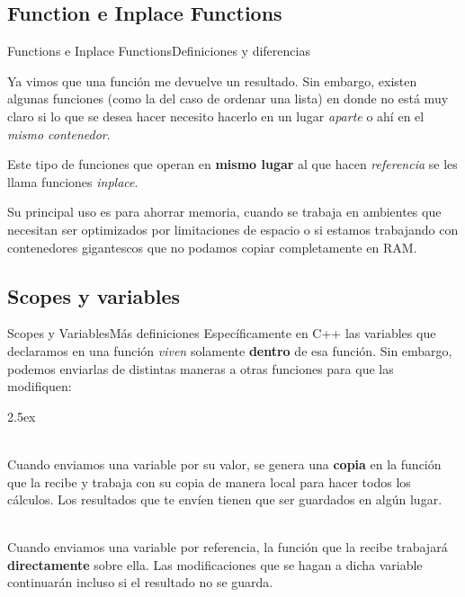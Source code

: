 \documentclass[spanish, c]{beamer}
\begin{document}
\subsection{Function e Inplace Functions}
\begin{frame}{Functions e Inplace Functions}{Definiciones y diferencias}

    Ya vimos que una función me devuelve un resultado. Sin embargo, existen algunas funciones (como la del caso de ordenar una lista) en donde no está muy claro si lo que se desea hacer necesito hacerlo en un lugar \textit{aparte} o ahí en el \textit{mismo contenedor}. \pause

    \bigskip

    Este tipo de funciones que operan en \textbf{mismo lugar} al que hacen \textit{referencia} se les llama \alert{funciones \textit{inplace}}. \pause

    \bigskip

    Su principal uso es para ahorrar memoria, cuando se trabaja en ambientes que necesitan ser optimizados por limitaciones de espacio o si estamos trabajando con contenedores gigantescos que no podamos copiar completamente en RAM.

\end{frame}

\subsection{Scopes y variables}
\begin{frame}{Scopes y Variables}{Más definiciones}
    Específicamente en C++ las variables que declaramos en una función \textit{viven} solamente \textbf{dentro} de esa función. Sin embargo, podemos enviarlas de distintas maneras a otras funciones para que las modifiquen: \pause
    
    \bigskip

    \begin{description}[style=unboxed]
        \itemsep2.5ex
        \item [\textit{Pass by value}] \hfill \\ Cuando enviamos una variable por su \alert{valor}, se genera una \textbf{copia} en la función que la recibe y trabaja con su copia de manera local para hacer todos los cálculos. Los resultados que te envíen tienen que ser guardados en algún lugar. \pause
        \item [\textit{Pass by reference}] \hfill \\ Cuando enviamos una variable por \alert{referencia}, la función que la recibe trabajará \textbf{directamente} sobre ella. Las modificaciones que se hagan a dicha variable continuarán incluso si el resultado no se guarda.
    \end{description}

\end{frame}
\end{document}
